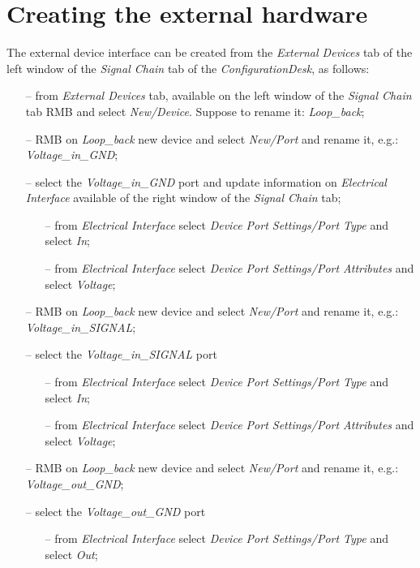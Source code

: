 \documentclass[11pt,a4paper,oneside]{book}
\numberwithin{equation}{section}
\theoremstyle{it}
\theoremstyle{definition}
\begin{document}
\section{Creating the external hardware}\label{creating_new_hardware}
The external device interface can be created from the \textit{External Devices} tab of the left window of the \textit{Signal Chain} tab of the \textit{ConfigurationDesk}, as follows:
\begin{itemize}
	\item[--] from \textit{External Devices} tab, available on the left window of the \textit{Signal Chain} tab RMB and select \textit{New/Device}. Suppose to rename it: \textit{Loop\_back};
	\item[--] RMB on \textit{Loop\_back} new device and select \textit{New/Port} and rename it, e.g.: \textit{Voltage\_in\_GND};
	\item[--] select the \textit{Voltage\_in\_GND} port and update information on \textit{Electrical Interface} available of the right window of the \textit{Signal Chain} tab;
		\begin{itemize}
		\item[--] from \textit{Electrical Interface} select \textit{Device Port Settings/Port Type} and select \textit{In};
		\item[--] from \textit{Electrical Interface} select \textit{Device Port Settings/Port Attributes} and select \textit{Voltage};
		\end{itemize}
	\item[--] RMB on \textit{Loop\_back} new device and select \textit{New/Port} and rename it, e.g.: \textit{Voltage\_in\_SIGNAL};
	\item[--] select the \textit{Voltage\_in\_SIGNAL} port
		\begin{itemize}
			\item[--] from \textit{Electrical Interface} select \textit{Device Port Settings/Port Type} and select \textit{In};
			\item[--] from \textit{Electrical Interface} select \textit{Device Port Settings/Port Attributes} and select \textit{Voltage};
		\end{itemize}
	\item[--] RMB on \textit{Loop\_back} new device and select \textit{New/Port} and rename it, e.g.: \textit{Voltage\_out\_GND};
	\item[--] select the \textit{Voltage\_out\_GND} port
		\begin{itemize}
			\item[--] from \textit{Electrical Interface} select \textit{Device Port Settings/Port Type} and select \textit{Out};

\end{itemize}
\end{itemize}
\end{document}
